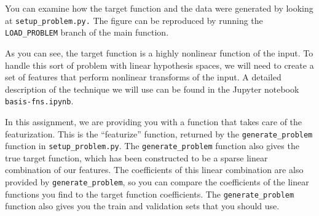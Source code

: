 \documentclass{article}
\begin{document}
You can examine how the target function and the data were generated by looking at \texttt{setup\_problem.py.} 
The figure can be reproduced by running the \texttt{LOAD\_PROBLEM} branch of the main function. 

As you can see, the target function is a highly nonlinear function
of the input. To handle this sort of problem with linear hypothesis
spaces, we will need to create a set of features that perform nonlinear
transforms of the input. A detailed description of the technique we
will use can be found in the Jupyter notebook \texttt{basis-fns.ipynb}. 

In this assignment, we are providing you with a function that takes
care of the featurization. This is the ``featurize'' function, returned
by the \texttt{generate\_problem} function in \texttt{setup\_problem.py}.
The \texttt{generate\_problem} function also gives the true target
function, which has been constructed to be a sparse linear combination
of our features. The coefficients of this linear combination are also
provided by \texttt{generate\_problem}, so you can compare the coefficients
of the linear functions you find to the target function coefficients\@.
The \texttt{generate\_problem} function also gives you the train and
validation sets that you should use\@.
\end{document}
